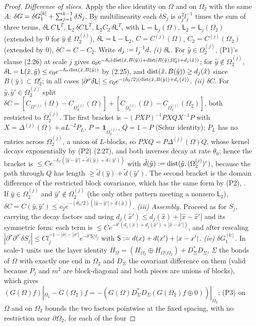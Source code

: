 \begin{proof}
\emph{Difference of slices.} Apply the slice identity on $\Omega$ and on $\Omega_2$ with the same $A$: $\delta G=\delta G^{[k]}_1+\sum_{j=1}^{k-1}\delta S_j$. By multilinearity each $\delta S_j$ is $a_j^2l_j^{-1}$ times the sum of three terms, $\delta\mathsf L\,C\,\mathsf L^T$, $\mathsf L_2\,\delta C\,\mathsf L^T$, $\mathsf L_2C_2\,\delta\mathsf L^T$, with $\mathsf L=\mathsf L_j(\Omega)$, $\mathsf L_2=\mathsf L_j(\Omega_2)$ (extended by $0$ for $\hat y\notin\Omega^{(j)}_2$), $\delta\mathsf L=\mathsf L-\mathsf L_2$, $C=C^{(j)}(\Omega)$, $C_2=C^{(j)}(\Omega_2)$ (extended by $0$), $\delta C=C-C_2$. Write $d_j:= l_j^{-1}d$. \emph{(i) $\delta\mathsf L$.} For $\hat y\in\Omega^{(j)}_2$, (P1)'s clause (2.26) at scale $j$ gives $c_0e^{-\delta_0(\operatorname{dist}(\hat x,B(\hat y))+\operatorname{dist}(B(\hat y),\Omega_2^c)+d_j(\hat x))}$; for $\hat y\notin\Omega^{(j)}_2$, $\delta\mathsf L=\mathsf L(\hat x,\hat y)\le c_0e^{-\delta_0\operatorname{dist}(\hat x,B(\hat y))}$ by (2.25), and $\operatorname{dist}(\hat x,B(\hat y))\ge d_j(\hat x)$ since $B(\hat y)\subset\Omega_2^c$; in all cases $|\partial^\sigma\delta\mathsf L|\le c_0e^{-(\delta_0/2)(\operatorname{dist}(\hat x,B(\hat y))+d_j(\hat x))}$. \emph{(ii) $\delta C$.} For $\hat y,\hat y'\in\Omega^{(j)}_2$ split $\delta C=[C_{\Omega^{(j)}}(\Omega)-C_{\Omega^{(j)}_2}(\Omega)]+[C_{\Omega^{(j)}_2}(\Omega)-C_{\Omega^{(j)}_2}(\Omega_2)]$, both restricted to $\Omega^{(j)}_2$. The first bracket is $-(PXP)^{-1}PXQX^{-1}P$ with $X=\Delta^{(j)}(\Omega)+aL^{-2}P_L$, $P=\mathbf 1_{\Omega^{(j)}_2}$, $Q=1-P$ (Schur identity); $P_L$ has no entries across $\Omega^{(j)}_2$, a union of $L$-blocks, so $PXQ=P\Delta^{(j)}(\Omega)Q$, whose kernel decays exponentially by (P2) (2.27), and both inverses decay at rate $\theta_0$; hence the bracket is $\le Ce^{-\delta_C(|\hat y-\hat y'|+\tilde d(\hat y)+\tilde d(\hat y'))}$ with $\tilde d(\hat y):=\operatorname{dist}(\hat y,(\Omega^{(j)}_2)^c)$, because the path through $Q$ has length $\ge\tilde d(\hat y)+\tilde d(\hat y')$. The second bracket is the domain difference of the restricted block covariance, which has the same form by (P2), \cite[(1.20)]{Ba4}. If $\hat y\in\Omega^{(j)}_2$ and $\hat y'\notin\Omega^{(j)}_2$ (the only other pattern meeting a nonzero $\mathsf L_2$), $\delta C=C(\hat y,\hat y')\le c_2e^{-(\theta_0/2)(|\hat y-\hat y'|+\tilde d(\hat y))}$. \emph{(iii) Assembly.} Proceed as for $S_j$, carrying the decay factors and using $d_j(\hat x')\le d_j(\hat x)+|\hat x-\hat x'|$ and its symmetric form: each term is $\le Ce^{-\delta'(d_j(\hat x)+d_j(\hat x')+|\hat x-\hat x'|)}$, and after rescaling $|\partial^\sigma\partial^{\sigma'}\delta S_j|\le Cl_j^{-1-|\sigma|-|\sigma'|}e^{-\delta'\mathsf S/l_j}$ with $\mathsf S:= d(x)+d(x')+|x-x'|$. \emph{(iv) $\delta G^{[k]}_1$.} In scale-$1$ units use the layer identity $H_\Omega=(H_{\Omega_2}\oplus H_{\Omega\setminus\Omega_2})+D_\Sigma^*D_\Sigma$, $\Sigma$ the bonds of $\Omega$ with exactly one end in $\Omega_2$ and $D_\Sigma$ the covariant difference on them (valid because $P_j$ and $m^2$ are block-diagonal and both pieces are unions of blocks), which gives $(G(\Omega)f)|_{\Omega_2}-G(\Omega_2)f=-(G(\Omega)D_\Sigma^*D_\Sigma(G(\Omega_2)f\oplus0))|_{\Omega_2}$; (P3) on $\Omega$ and on $\Omega_2$ bounds the two factors pointwise at the fixed spacing, with no restriction near $\partial\Omega_2$, for each of the four 
\end{proof}
